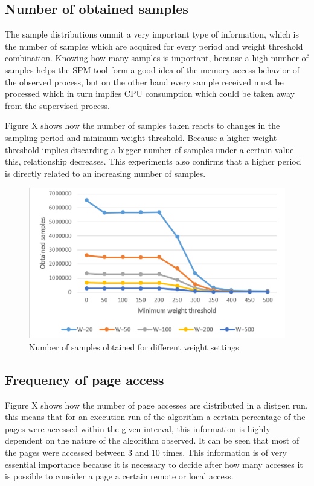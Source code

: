 \subsection{Number of obtained samples}\label{subsection:pmu-obtainedsamp}

The sample distributions ommit a very important type of information, which is the number of samples which are acquired for every period and weight threshold combination. Knowing how many samples is important, because a high number of samples helps the SPM tool form a good idea of the memory access behavior of the observed process, but on the other hand every sample received must be processed which in turn implies CPU consumption which could be taken away from the supervised process. 

Figure X shows how the number of samples taken reacts to changes in the sampling period and minimum weight threshold. Because a higher weight threshold implies discarding a bigger number of samples under a certain value this, relationship decreases. This experiments also confirms that a higher period is directly related to an increasing number of samples.


\begin{figure}[th]
	\centering
		\includegraphics[width=.8\textwidth]{figures/number-samples.eps}
		\caption{Number of samples obtained for different weight settings }
		\label{fig:pmu-obtainedsamp}
\end{figure}

\subsection{Frequency of page access}\label{subsection:pmu-freqpgacc}

Figure X shows how the number of page accesses are distributed in a distgen run, this means that for an execution run of the algorithm a certain percentage of the pages were accessed within the given interval, this information is highly dependent on the nature of the algorithm observed. It can be seen that most of the pages were accessed between 3 and 10 times. This information is of very essential importance because it is necessary to decide after how many accesses it is possible to consider a page a certain remote or local access.

